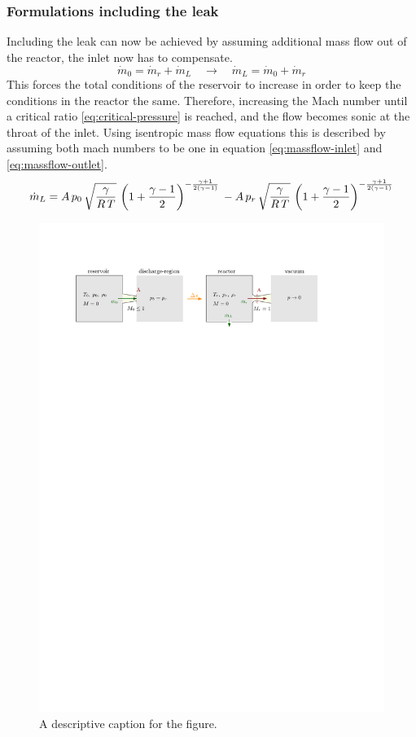 \subsubsection*{Formulations including the leak}
	Including the leak can now be achieved by assuming additional mass flow out of the reactor, the inlet now has to compensate.
	$$
		\dot{m}_0 = \dot{m}_r + \dot{m}_L
		\quad \to \quad
		\dot{m}_L = \dot{m}_0 + \dot{m}_r
	$$
	This forces the total conditions of the reservoir to increase in order to keep the conditions in the reactor the same.
	Therefore, increasing the Mach number until a critical ratio \eqref{eq:critical-pressure} is reached, and the flow becomes sonic at the throat of the inlet.
	Using isentropic mass flow equations this is described by assuming both mach numbers to be one in equation \eqref{eq:massflow-inlet} and \eqref{eq:massflow-outlet}.
	$$
		\dot{m}_L =
		A\, p_0\, \sqrt{\frac{\gamma}{R\,T}}\, \left(1+\frac{\gamma-1}{2}\right)^{-\frac{\gamma+1}{2(\gamma-1)}}\\\\
		- A\, p_r\, \sqrt{\frac{\gamma}{R\,T}}\,\left(1+\frac{\gamma-1}{2}\right)^{-\frac{\gamma+1}{2(\gamma-1)}}
	$$
	\begin{figure}[H]
	    \centering
	    \includegraphics[width=\textwidth]{src/03_analytical-work/fig_disconnected-reservoirs-with-leak.pdf}
	    \caption{A descriptive caption for the figure.}
	    \label{fig:disconnected-reservoirs-leak}
	\end{figure}
